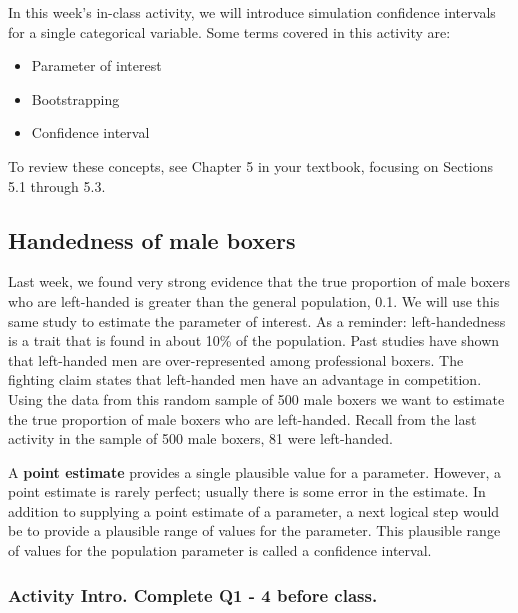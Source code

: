 \documentclass[
]{report}
\begin{document}
In this week's in-class activity, we will introduce simulation confidence intervals for a single categorical variable. Some terms covered in this activity are:

\begin{itemize}
\item
  Parameter of interest
\item
  Bootstrapping
\item
  Confidence interval
\end{itemize}

To review these concepts, see Chapter 5 in your textbook, focusing on Sections 5.1 through 5.3.

\hypertarget{handedness-of-male-boxers-1}{%
\subsection{Handedness of male boxers}\label{handedness-of-male-boxers-1}}

Last week, we found very strong evidence that the true proportion of male boxers who are left-handed is greater than the general population, 0.1. We will use this same study to estimate the parameter of interest. As a reminder: left-handedness is a trait that is found in about 10\% of the population. Past studies have shown that left-handed men are over-represented among professional boxers. The fighting claim states that left-handed men have an advantage in competition. Using the data from this random sample of 500 male boxers we want to estimate the true proportion of male boxers who are left-handed. Recall from the last activity in the sample of 500 male boxers, 81 were left-handed.

A \textbf{point estimate} provides a single plausible value for a parameter. However, a point estimate is rarely perfect; usually there is some error in the estimate. In addition to supplying a point estimate of a parameter, a next logical step would be to provide a plausible range of values for the parameter. This plausible range of values for the population parameter is called a confidence interval.

\hypertarget{activity-intro.-complete-q1---4-before-class.}{%
\subsubsection*{Activity Intro. Complete Q1 - 4 before class.}\label{activity-intro.-complete-q1---4-before-class.}}
\end{document}
